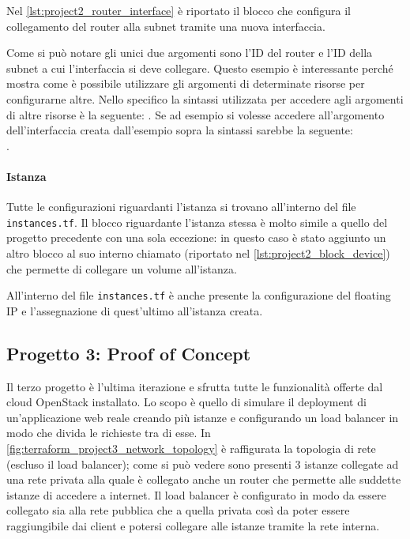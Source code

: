 Nel \cref{lst:project2_router_interface} è riportato il blocco che configura il collegamento del router alla subnet tramite una nuova interfaccia.

\noindent
Come si può notare gli unici due argomenti sono l'ID del router e l'ID della subnet a cui l'interfaccia si deve collegare. Questo esempio è interessante perché mostra come è possibile utilizzare gli argomenti di determinate risorse per configurarne altre. Nello specifico la sintassi utilizzata per accedere agli argomenti di altre risorse è la seguente: . Se ad esempio si volesse accedere all'argomento  dell'interfaccia creata dall'esempio sopra la sintassi sarebbe la seguente: \\
.

\paragraph{Istanza}

Tutte le configurazioni riguardanti l'istanza si trovano all'interno del file \verb|instances.tf|. Il blocco riguardante l'istanza stessa è molto simile a quello del progetto precedente con una sola eccezione: in questo caso è stato aggiunto un altro blocco al suo interno chiamato  (riportato nel \cref{lst:project2_block_device}) che permette di collegare un volume all'istanza.


All'interno del file \verb|instances.tf| è anche presente la configurazione del floating IP e l'assegnazione di quest'ultimo all'istanza creata.


\subsection{Progetto 3: Proof of Concept}

Il terzo progetto è l'ultima iterazione e sfrutta tutte le funzionalità offerte dal cloud OpenStack installato. Lo scopo è quello di simulare il deployment di un'applicazione web reale creando più istanze e configurando un load balancer in modo che divida le richieste tra di esse. In \cref{fig:terraform_project3_network_topology} è raffigurata la topologia di rete (escluso il load balancer); come si può vedere sono presenti 3 istanze collegate ad una rete privata alla quale è collegato anche un router che permette alle suddette istanze di accedere a internet. Il load balancer è configurato in modo da essere collegato sia alla rete pubblica che a quella privata così da poter essere raggiungibile dai client e potersi collegare alle istanze tramite la rete interna.

